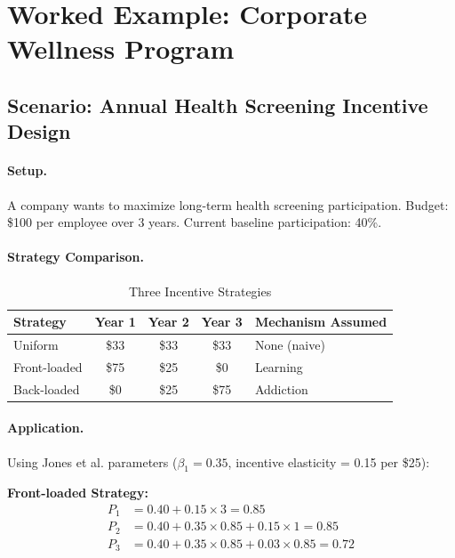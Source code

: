 \section{Worked Example: Corporate Wellness Program}
\label{sec:hf-example}

\subsection{Scenario: Annual Health Screening Incentive Design}

\paragraph{Setup.} A company wants to maximize long-term health screening participation.
Budget: \$100 per employee over 3 years. Current baseline participation: 40\%.

\paragraph{Strategy Comparison.}

\begin{table}[htbp]
\centering
\caption{Three Incentive Strategies}
\label{tab:hf-strategies}
\renewcommand{\arraystretch}{1.3}
\begin{tabular}{@{}lcccl@{}}
\toprule
\textbf{Strategy} & \textbf{Year 1} & \textbf{Year 2} & \textbf{Year 3} & \textbf{Mechanism Assumed} \\
\midrule
Uniform & \$33 & \$33 & \$33 & None (naive) \\
Front-loaded & \$75 & \$25 & \$0 & Learning \\
Back-loaded & \$0 & \$25 & \$75 & Addiction \\
\bottomrule
\end{tabular}
\end{table}

\paragraph{Application.} Using Jones et al. parameters ($\beta_1 = 0.35$, incentive elasticity = 0.15 per \$25):

\textbf{Front-loaded Strategy:}
\begin{align}
P_1 &= 0.40 + 0.15 \times 3 = 0.85 \\
P_2 &= 0.40 + 0.35 \times 0.85 + 0.15 \times 1 = 0.85 \\
P_3 &= 0.40 + 0.35 \times 0.85 + 0.03 \times 0.85 = 0.72
\end{align}

